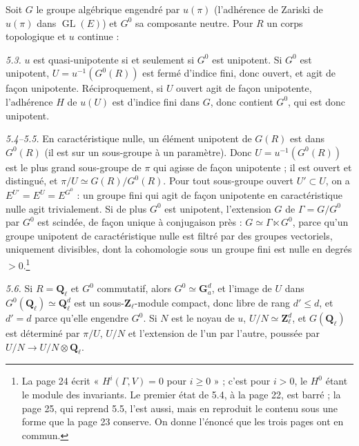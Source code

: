 \documentclass[11pt,a4paper]{article}
\begin{document}
Soit $G$ le groupe algébrique engendré par $u(\pi)$ (l'adhérence de Zariski
de $u(\pi)$ dans $\operatorname{GL}(E)$) et $G^0$ sa composante neutre. Pour
$R$ un corps topologique et $u$ continue :

\emph{5.3.} $u$ est quasi-unipotente si et seulement si $G^0$ est unipotent.
Si $G^0$ est unipotent, $U = u^{-1}(G^0(R))$ est fermé d'indice fini, donc
ouvert, et agit de façon unipotente. Réciproquement, si $U$ ouvert agit de façon
unipotente, l'adhérence $H$ de $u(U)$ est d'indice fini dans $G$, donc contient
$G^0$, qui est donc unipotent.

\emph{5.4--5.5.} En caractéristique nulle, un élément unipotent de $G(R)$ est dans
$G^0(R)$ (il est sur un sous-groupe à un paramètre). Donc
$U = u^{-1}(G^0(R))$ est le plus grand sous-groupe de $\pi$ qui agisse de façon
unipotente ; il est ouvert et distingué, et $\pi/U \simeq G(R)/G^0(R)$. Pour
tout sous-groupe ouvert $U' \subset U$, on a $E^{U'} = E^U = E^{G^0}$ : un
groupe fini qui agit de façon unipotente en caractéristique nulle agit
trivialement. Si de plus $G^0$ est unipotent, l'extension $G$ de
$\Gamma = G/G^0$ par $G^0$ est scindée, de façon unique à conjugaison près :
$G \simeq \Gamma \ltimes G^0$, parce qu'un groupe unipotent de caractéristique
nulle est filtré par des groupes vectoriels, uniquement divisibles, dont la
cohomologie sous un groupe fini est nulle en degrés $>0$.\footnote{La page 24
écrit « $H^i(\Gamma, V) = 0$ pour $i \geq 0$ » ; c'est pour $i > 0$, le
$H^0$ étant le module des invariants. Le premier état de 5.4, à la page 22, est
barré ; la page 25, qui reprend 5.5, l'est aussi, mais en reproduit le contenu
sous une forme que la page 23 conserve. On donne l'énoncé que les trois pages
ont en commun.}

\emph{5.6.} Si $R = \mathbf{Q}_\ell$ et $G^0$ commutatif, alors $G^0 \simeq
\mathbf{G}_a^d$, et l'image de $U$ dans $G^0(\mathbf{Q}_\ell) \simeq
\mathbf{Q}_\ell^d$ est un sous-$\mathbf{Z}_\ell$-module compact, donc libre de
rang $d' \leq d$, et $d' = d$ parce qu'elle engendre $G^0$. Si $N$ est le noyau
de $u$, $U/N \simeq \mathbf{Z}_\ell^d$, et $G(\mathbf{Q}_\ell)$ est déterminé
par $\pi/U$, $U/N$ et l'extension de l'un par l'autre, poussée par
$U/N \to U/N \otimes \mathbf{Q}_\ell$.
\end{document}

